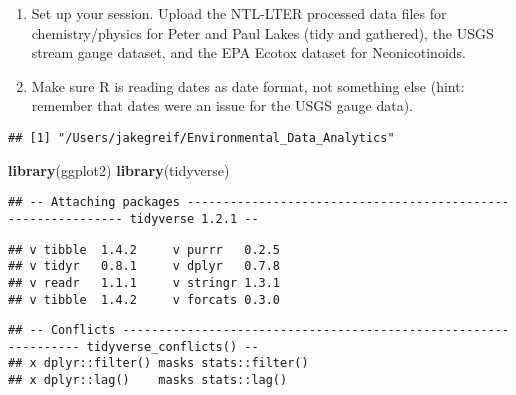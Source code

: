 \documentclass[]{article}
\newenvironment{Shaded}{\begin{snugshade}}{\end{snugshade}}
\newcommand{\KeywordTok}[1]{\textcolor[rgb]{0.13,0.29,0.53}{\textbf{#1}}}
\newcommand{\CommentTok}[1]{\textcolor[rgb]{0.56,0.35,0.01}{\textit{#1}}}
\newcommand{\NormalTok}[1]{#1}
\begin{document}
\begin{enumerate}
\def\labelenumi{\arabic{enumi}.}
\item
  Set up your session. Upload the NTL-LTER processed data files for
  chemistry/physics for Peter and Paul Lakes (tidy and gathered), the
  USGS stream gauge dataset, and the EPA Ecotox dataset for
  Neonicotinoids.
\item
  Make sure R is reading dates as date format, not something else (hint:
  remember that dates were an issue for the USGS gauge data).
\end{enumerate}

\begin{Shaded}
\end{Shaded}

\begin{verbatim}
## [1] "/Users/jakegreif/Environmental_Data_Analytics"
\end{verbatim}

\begin{Shaded}
\begin{Highlighting}[]
\KeywordTok{library}\NormalTok{(ggplot2)}
\KeywordTok{library}\NormalTok{(tidyverse)}
\end{Highlighting}
\end{Shaded}

\begin{verbatim}
## -- Attaching packages ------------------------------------------------------------- tidyverse 1.2.1 --
\end{verbatim}

\begin{verbatim}
## v tibble  1.4.2     v purrr   0.2.5
## v tidyr   0.8.1     v dplyr   0.7.8
## v readr   1.1.1     v stringr 1.3.1
## v tibble  1.4.2     v forcats 0.3.0
\end{verbatim}

\begin{verbatim}
## -- Conflicts ---------------------------------------------------------------- tidyverse_conflicts() --
## x dplyr::filter() masks stats::filter()
## x dplyr::lag()    masks stats::lag()
\end{verbatim}
\end{document}
